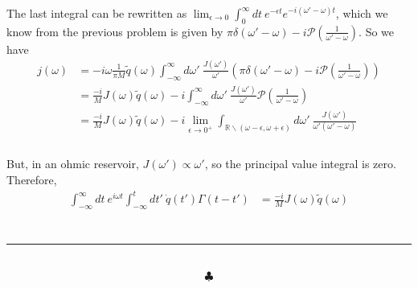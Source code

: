 \documentclass[]{article}
\begin{document}
\begin{enumerate}[1)]
The last integral can be rewritten as $ \lim_{\epsilon \to 0} \int_{0}^{\infty} dt \:   e^{-\epsilon t } e^{ - i ( \omega' - \omega )  t  }$, which we know from the previous problem is given by $ \pi \delta(  \omega' - \omega )    - i   \mathscr{P} \left(  \frac{1}{  \omega' - \omega }  \right)  $. So we have \\

\begin{equation}
\begin{aligned}
j(\omega) & = - i \omega  \frac{ 1 }{ \pi M } \tilde{q}(\omega)    \int_{-\infty}^{\infty} d\omega' \: \frac{  J( \omega' ) }{ \omega' } \left(   \pi \delta(  \omega' - \omega )    - i   \mathscr{P} \left(  \frac{1}{  \omega' - \omega }  \right)  \right) \\
%
& =   \frac{ - i  }{  M } J( \omega ) \tilde{q}(\omega)  - i    \int_{-\infty}^{\infty} d\omega' \: \frac{  J( \omega' ) }{ \omega' }    \mathscr{P} \left(  \frac{1}{  \omega' - \omega }  \right) \\
%
& =   \frac{ - i  }{  M } J( \omega ) \tilde{q}(\omega)  - i  \lim_{\epsilon \to 0^+ }  \int_{\mathbb{R}  \backslash ( \omega - \epsilon, \omega + \epsilon)} d\omega' \: \frac{  J( \omega' ) }{ \omega' (  \omega' - \omega  )}    \\
\end{aligned}
\end{equation} \\

But, in an ohmic reservoir, $J(\omega') \propto \omega'$, so the principal value integral is zero. Therefore, \\

\begin{equation}
\begin{aligned}
 \int_{-\infty}^{\infty} dt \: e^{ i \omega t } \int_{-\infty}^{t} dt' \: \dot{q}(t') \Gamma(t - t' ) & =   \frac{ - i  }{  M } J( \omega ) \tilde{q}(\omega)  \\ %
\end{aligned}
\end{equation} \\


\end{enumerate}



\noindent\rule{15cm}{0.4pt} \\

$$\clubsuit$$
\end{document}
